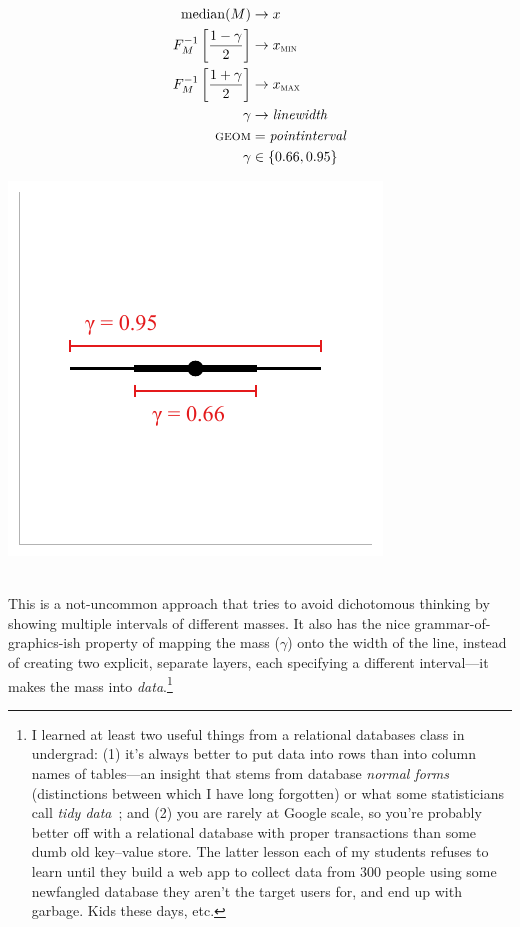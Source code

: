 \documentclass[journal]{vgtc}                     %
\newcommand{\equationfigure}[2]{%
\noindent
\begin{minipage}{.5\columnwidth}
\setlength{\abovedisplayskip}{0pt}
\setlength{\belowdisplayskip}{0pt}
#1\end{minipage}%
\begin{minipage}{.4\columnwidth}\centering #2 \end{minipage}%
\vspace{.5\belowdisplayskip}\\
}
\begin{document}
\equationfigure{
\begin{align*}
\operatorname{median}(M) &\rightarrow x\\
F_M^{-1}\left[\frac{1 - \gamma}{2}\right] &\rightarrow x_\textsc{min}\\
F_M^{-1}\left[\frac{1 + \gamma}{2}\right] &\rightarrow x_\textsc{max}\\
\gamma &\rightarrow \mathit{linewidth}\\
\textsc{geom} &= \mathit{pointinterval}\\
\gamma &\in \{0.66, 0.95\}
\end{align*}
}{\includegraphics[width=1.2\columnwidth]{figs/3-stat_pointinterval_linewidth.pdf}}
This is a not-uncommon approach that tries to avoid dichotomous thinking by showing multiple intervals of different masses. It also has the nice grammar-of-graphics-ish property of mapping the mass ($\gamma$) onto the width of the line, instead of creating two explicit, separate layers, each specifying a different interval---it makes the mass into \textit{data}.\footnote{I learned at least two useful things from a relational databases class in undergrad: (1) it's always better to put data into rows than into column names of tables---an insight that stems from database \textit{normal forms}~\cite{codd1990relational} (distinctions between which I have long forgotten) or what some statisticians call \textit{tidy data}~\cite{hadley2014tidy}; and (2) you are rarely at Google scale, so you're probably better off with a relational database with proper transactions than some dumb old key--value store. The latter lesson each of my students refuses to learn until they build a web app to collect data from 300 people using some newfangled database they aren't the target users for, and end up with garbage. Kids these days, etc.}
\end{document}
